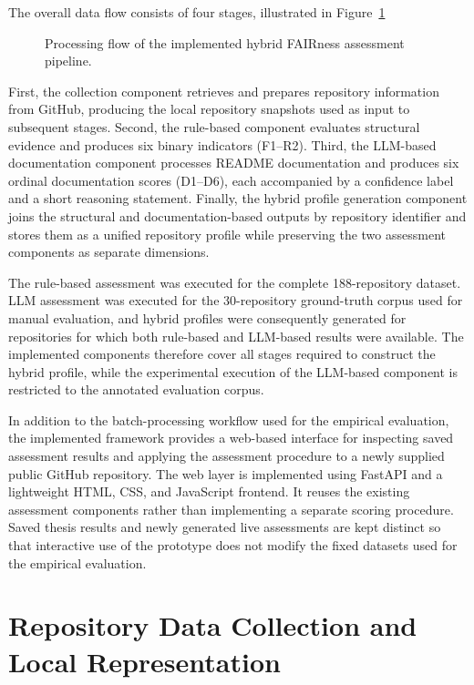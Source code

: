 The overall data flow consists of four stages, illustrated in
Figure~\ref{fig:system_architecture}

\begin{figure}[htbp]
    \centering
    
     \caption{Processing flow of the implemented hybrid FAIRness assessment pipeline.}
    \label{fig:system_architecture}
\end{figure}

First, the collection component retrieves and prepares repository
information from GitHub, producing the local repository snapshots used
as input to subsequent stages. Second, the rule-based component
evaluates structural evidence and produces six binary indicators
(F1--R2). Third, the LLM-based documentation component processes README documentation
and produces six ordinal documentation scores (D1--D6), each
accompanied by a confidence label and a short reasoning statement.
Finally, the hybrid profile generation component joins the structural
and documentation-based outputs by repository identifier and stores
them as a unified repository profile while preserving the two
assessment components as separate dimensions.

The rule-based assessment was executed for the complete
188-repository dataset. LLM assessment was executed for the
30-repository ground-truth corpus used for manual evaluation, and
hybrid profiles were consequently generated for repositories for
which both rule-based and LLM-based results were available. The implemented components therefore cover all stages required to
construct the hybrid profile, while the experimental execution of the
LLM-based component is restricted to the annotated evaluation corpus.

In addition to the batch-processing workflow used for the empirical
evaluation, the implemented framework provides a web-based interface
for inspecting saved assessment results and applying the assessment
procedure to a newly supplied public GitHub repository. The web layer
is implemented using FastAPI and a lightweight HTML, CSS, and
JavaScript frontend. It reuses the existing assessment components
rather than implementing a separate scoring procedure. Saved thesis
results and newly generated live assessments are kept distinct so that
interactive use of the prototype does not modify the fixed datasets
used for the empirical evaluation.

\section{Repository Data Collection and Local Representation}

